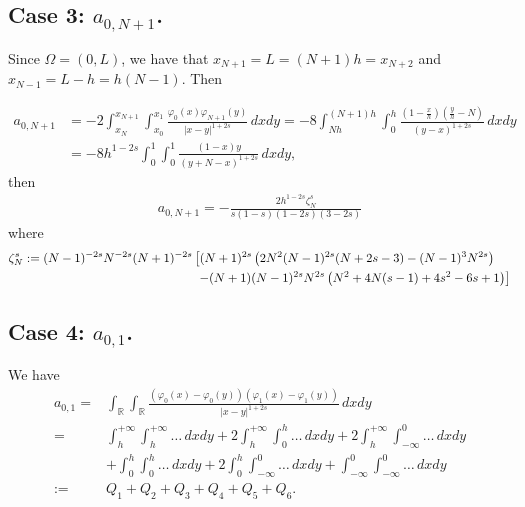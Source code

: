 \documentclass[11 pt]{article}
\numberwithin{equation}{section}
\newcommand{\RR}{\mathbb{R}}
\begin{document}
\subsection{Case 3: $a_{0,N+1}$.} Since $\Omega=(0,L)$, we have that $x_{N+1}=L=(N+1)h=x_{N+2}$ and $x_{N-1}=L-h=h(N-1)$. Then

\begin{align*}
a_{0,N+1}&=-2 \int_{x_{N}}^{x_{N+1}}\int_{x_0}^{x_1}\frac{\varphi_0(x)\varphi_{N+1}(y)}{|x-y|^{1+2s}}\,dxdy
=-8\int_{Nh}^{(N+1)h}\int_0^{h}\frac{\left(1-\frac{x}{h}\right)\left(\frac{y}{h}-N\right)}{(y-x)^{1+2s}}\,dxdy\\
&=-8h^{1-2s}\int_{0}^{1}\int_0^{1}\frac{\left(1-x\right)y}{(y+N-x)^{1+2s}}\,dxdy,
\end{align*}
then
%
\begin{align*}
a_{0,N+1} = -\frac{2 h^{1-2 s} \zeta_N^s }{s(1-s)(1-2s )(3-2 s)}
\end{align*}
%
where 
%
\begin{align}\notag 
\zeta_N^s:= (N-1)^{-2 s} N^{-2 s} (N+1)^{-2 s}
   &\left[(N+1)^{2 s} \left(2 N^2 (N-1)^{2 s} (N+2 s-3)-(N-1)^3
   N^{2 s}\right) \right. \\  & \label{eq:def_zeta_N} \;
   \left. -(N+1) (N-1)^{2 s} N^{2 s} \left(N^2+4 N (s-1)+4
   s^2-6 s+1\right)\right]
\end{align}
%


\subsection{Case 4: $a_{0,1}$.}

We have 
	\begin{align*}
	a_{0,1}= & \int_{\RR}\int_{\RR}\frac{(\varphi_0(x)-\varphi_0(y))(\varphi_{1}(x)-\varphi_{1}(y))}{|x-y|^{1+2s}}\,dxdy
	\\
	= & \int_{h}^{+\infty}\int_{h}^{+\infty} \ldots\,dxdy + 2\int_{h}^{+\infty}\int_{0}^{h} \ldots\,dxdy + 2\int_{h}^{+\infty}\int_{-\infty}^{0} \ldots\,dxdy 
	\\
	& + \int_{0}^{h}\int_{0}^{h} \ldots\,dxdy + 2\int_{0}^{h}\int_{-\infty}^{0} \ldots\,dxdy + \int_{-\infty}^{0}\int_{-\infty}^{0} \ldots\,dxdy 
	\\
	:= & Q_1 + Q_2 + Q_3 + Q_4 + Q_5 + Q_6.
\end{align*}
\end{document}
